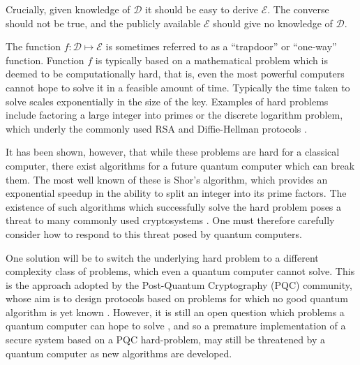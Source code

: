 Crucially, given knowledge of $\mathcal{D}$ it should be easy to derive $\mathcal{E}$. The converse should not be true, and the publicly available $\mathcal{E}$ should give no knowledge of $\mathcal{D}$. %

The function $f: \mathcal{D} \mapsto \mathcal{E}$ is sometimes referred to as a ``trapdoor'' or ``one-way'' function. Function $f$ is typically based on a mathematical problem which is deemed to be computationally hard, that is, even the most powerful computers cannot hope to solve it in a feasible amount of time. Typically the time taken to solve scales exponentially in the size of the key. Examples of hard problems include factoring a large integer into primes or the discrete logarithm problem, which underly the commonly used RSA  and Diffie-Hellman protocols \cite{Rivest1979, Diffie1976, Schneier1996}.

It has been shown, however, that while these problems are hard for a classical computer, there exist algorithms for a future quantum computer which can break them. The most well known of these is Shor's algorithm, \cite{Shor1997} which provides an exponential speedup in the ability to split an integer into its prime factors. %
The existence of such algorithms which successfully solve the hard problem poses a threat to many commonly used cryptosystems %
\cite{Rivest1976, Schneier1996, Amiri2015, Nielsen2010, Shor1997}. One must therefore carefully consider how to respond to this threat posed by quantum computers. 

One solution will be to switch the underlying hard problem to a different complexity class of problems, which even a quantum computer cannot solve. This is the approach adopted by the Post-Quantum Cryptography (PQC) community, whose aim is to design protocols based on problems for which no good quantum algorithm is yet known \cite{Bernstein2017, Chen2016, Gagliardoni2017a, Bernstein2019, Alagic2019, Chrome2016}. However, it is still an open question which problems a quantum computer can hope to solve%
, and so a premature implementation of a secure system based on a PQC hard-problem, may still be threatened by a quantum computer as new algorithms are developed. 

